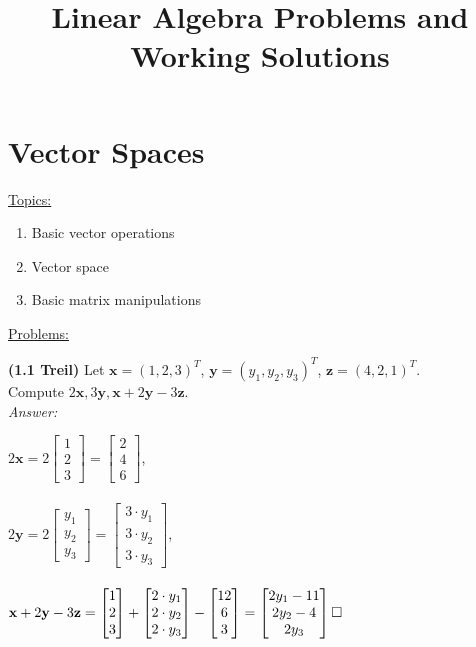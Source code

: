 \documentclass{book}
\title{Linear Algebra Problems and Working Solutions}
\date{}
\renewcommand{\vec}[1]{\mathbf{#1}}
\begin{document}
	\maketitle
	\chapter{Vector Spaces}
	\underline{Topics:}
	\begin{enumerate}
		\item Basic vector operations
		\item Vector space
		\item Basic matrix manipulations
	\end{enumerate}	
	\underline{Problems:}
	
	\noindent\textbf{(1.1 Treil)}
	Let $\vec{x} = (1,2,3)^T$,
	$\vec{y} = (y_1,y_2,y_3)^T$, 
	$\vec{z} = (4,2,1)^T.$ 
	\\Compute $2\vec{x}, 3\vec{y}, \vec{x}+2\vec{y}-3\vec{z}.$  	
	\\\textit{Answer:}
	
	$
	2\vec{x}=2 
	\begin{bmatrix}
	1\\2\\3
	\end{bmatrix}
	= \begin{bmatrix}
	2\\4\\6
	\end{bmatrix}
	$,\\\\

	$
	2\vec{y}=2 
	\begin{bmatrix}
	y_1\\y_2\\y_3
	\end{bmatrix}
	= \begin{bmatrix}
	3\cdot y_1\\3\cdot y_2\\3\cdot y_3
	\end{bmatrix}
	$,\\\\

	$
	\vec{x}+2\vec{y}-3\vec{z}= 
	\begin{bmatrix}
	1\\2\\3
	\end{bmatrix}+
	\begin{bmatrix}
	2\cdot y_1\\2\cdot y_2\\2\cdot y_3
	\end{bmatrix}-
	\begin{bmatrix}
	12\\6\\3
	\end{bmatrix}=
	\begin{bmatrix}
	2y_1-11\\2y_2-4\\2y_3
	\end{bmatrix}
	\\\square $\\\\
\end{document}

